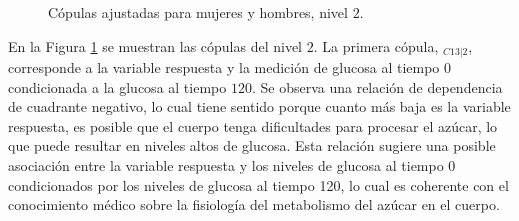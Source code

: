 \begin{figure}[H]
 \centering
    \caption{Cópulas ajustadas para mujeres y hombres, nivel $2$.}
    \label{fig:Modelo4TotalNivel2}
\end{figure}

En la Figura \ref{fig:Modelo4TotalNivel2} se muestran las cópulas del nivel $2$. La primera cópula, $_{C13|2}$, corresponde a la variable respuesta y la medición de glucosa al tiempo $0$ condicionada a la glucosa al tiempo $120$. Se observa una relación de dependencia de cuadrante negativo, lo cual tiene sentido porque cuanto más baja es la variable respuesta, es posible que el cuerpo tenga dificultades para procesar el azúcar, lo que puede resultar en niveles altos de glucosa. Esta relación sugiere una posible asociación entre la variable respuesta y los niveles de glucosa al tiempo $0$ condicionados por los niveles de glucosa al tiempo 120, lo cual es coherente con el conocimiento médico sobre la fisiología del metabolismo del azúcar en el cuerpo.

